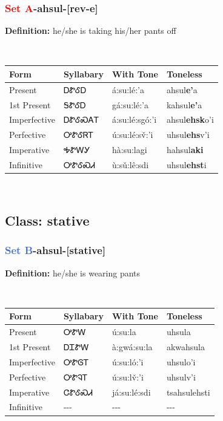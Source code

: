 \subsubsection*{\textcolor{Red}{Set A}{-}\textbf{ahsul}{-}[rev-e]}
\nopagebreak
\textbf{Definition: } he/she is taking his/her pants off
\\[0.5em]
\begin{tabularx}{\textwidth}{l X X X}%
\toprule%
\textbf{Form}&\textbf{Syllabary}&\textbf{With Tone}&\textbf{Toneless}\\%
\midrule%
Present&ᎠᏑᎴᎠ&á:su:lé:’a&ahsul\textbf{e'}a\\%
1st Present&ᎦᏑᎴᎠ&gá:su:lé:’a&kahsul\textbf{e'}a\\%
Imperfective&ᎠᏑᎴᏍᎪᎢ&á:su:lé:sgó:’i&ahsul\textbf{ehsk}o'i\\%
Perfective&ᎤᏑᎴᏒᎢ&ú:su:lé:sv̌:’i&uhsul\textbf{ehs}v'i\\%
Imperative&ᎭᏑᎳᎩ&hà:su:lagi&hahsul\textbf{aki}\\%
Infinitive&ᎤᏑᎴᏍᏗ&ù:sǔ:lê:sdi&uhsul\textbf{ehst}i\\%
\bottomrule%
\end{tabularx}
\\[1em]
\needspace{3in}
\subsection*{Class: stative}
\nopagebreak
\needspace{2in}
\subsubsection*{\textcolor{RoyalBlue}{Set B}{-}\textbf{ahsul}{-}[stative]}
\nopagebreak
\textbf{Definition: } he/she is wearing pants
\\[0.5em]
\begin{tabularx}{\textwidth}{l X X X}%
\toprule%
\textbf{Form}&\textbf{Syllabary}&\textbf{With Tone}&\textbf{Toneless}\\%
\midrule%
Present&ᎤᏑᎳ&ú:su:la&uhsula\\%
1st Present&ᎠᏆᏑᎳ&à:gwá:su:la&akwahsula\\%
Imperfective&ᎤᏑᎶᎢ&ú:su:ló:’i&uhsulo'i\\%
Perfective&ᎤᏑᎸᎢ&ú:su:lv̌:’i&uhsulv'i\\%
Imperative&ᏣᏑᎴᏍᏗ&já:su:lé:sdi&tsahsulehsti\\%
Infinitive&{-}{-}{-}&{-}{-}{-}&{-}{-}{-}\\%
\bottomrule%
\end{tabularx}
\\[1em]
\needspace{3in}
